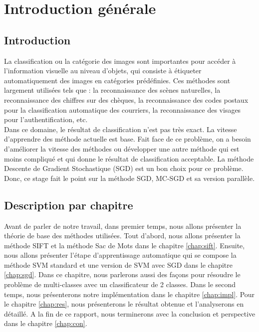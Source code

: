 \chapter{Introduction générale}

\section{Introduction}

La classification ou la catégorie des images sont importantes pour accéder à l'information visuelle au niveau d'objets, qui consiste à étiqueter automatiquement des images en catégories prédéfinies. Ces méthodes sont largement utilisées tels que : la reconnaissance des scènes naturelles, la reconnaissance des chiffres sur des chèques, la reconnaissance des codes postaux pour la classification automatique des courriers, la reconnaissance des visages pour l'authentification, etc.\\

Dans ce domaine, le résultat de classification n'est pas très exact. La vitesse d'apprendre des méthode actuelle est base. Fait face de ce problème, on a besoin d'améliorer la vitesse des méthodes ou développer une autre méthode qui est moins compliqué et qui donne le résultat de classification acceptable. La méthode Descente de Gradient Stochastique (SGD) est un bon choix pour ce problème. Donc, ce stage fait le point sur la méthode SGD, MC-SGD et sa version parallèle.

\section{Description par chapitre}

Avant de parler de notre travail, dans premier temps, nous allons présenter la théorie de base des méthodes utilisées. Tout d'abord, nous allons présenter la méthode SIFT et la méthode Sac de Mots dans le chapitre \ref{chap:sift}. Ensuite, nous allons présenter l'étape d'apprentissage automatique qui se compose la méthode SVM standard et une version de SVM avec SGD dans le chapitre \ref{chap:sgd}. Dans ce chapitre, nous parlerons aussi des façons pour résoudre le problème de multi-classes avec un classificateur de 2 classes. Dans le second temps, nous présenterons notre implémentation dans le chapitre \ref{chap:impl}. Pour le chapitre \ref{chap:res}, nous présenterons le résultat obtenue et l'analyserons en détaillé. A la fin de ce rapport, nous terminerons avec la conclusion et perspective dans le chapitre \ref{chap:con}.